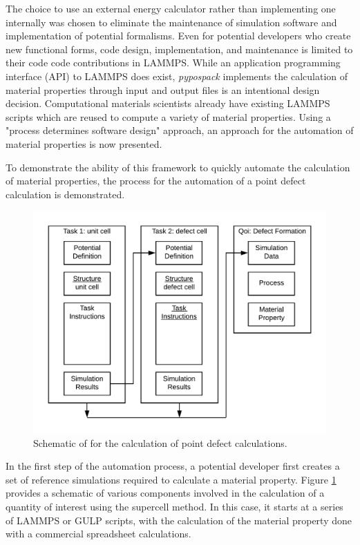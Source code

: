 The choice to use an external energy calculator rather than implementing one internally was chosen to eliminate the maintenance of simulation software and implementation of potential formalisms.  Even for potential developers who create new functional forms, code design, implementation, and maintenance is limited to their code code contributions in LAMMPS.
While an application programming interface (API) to LAMMPS does exist, \emph{pypospack} implements the calculation of material properties through input and output files is an intentional design decision.  Computational materials scientists already have existing LAMMPS scripts which are reused to compute a variety of material properties.  Using a "process determines software design" approach, an approach for the automation of material properties is now presented.

To demonstrate the ability of this framework to quickly automate the calculation of material properties, the process for the automation of a point defect calculation is demonstrated.

\begin{figure}[ht]
	\label{fig_point_defect_calculation}
	\centering
	\includegraphics[width=5in]{chapter6/img/fig_point_defect}
	\caption{Schematic of for the calculation of point defect calculations.}
\end{figure}

In the first step of the automation process, a potential developer first creates a set of reference simulations required to calculate a material property.  Figure \ref{fig_point_defect_calculation} provides a schematic of various components involved in the calculation of a quantity of interest using the supercell method.  In this case, it starts at a series of LAMMPS or GULP scripts, with the calculation of the material property done with a commercial spreadsheet calculations.

